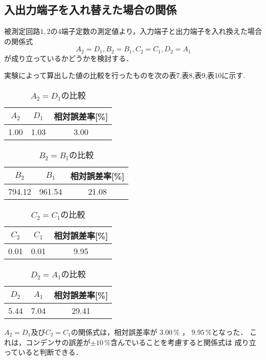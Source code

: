 \newpage

\subsection{入出力端子を入れ替えた場合の関係}
被測定回路$1,2$の4端子定数の測定値より，入力端子と出力端子を入れ換えた場合の関係式
$$
A_2=D_1, B_2=B_1, C_2=C_1, D_2=A_1
$$
が成り立っているかどうかを検討する．

実験によって算出した値の比較を行ったものを次の表7,表8,表9,表10に示す.

\begin{table}[!ht]
    \centering
    \caption{$A_2=D_1$の比較}
    \begin{tabular}{cc|c}
    \hline
        $A_2$ & $D_1$ & 相対誤差率[\%] \\ \hline
        1.00 & 1.03 & 3.00 \\ \hline
    \end{tabular}
\end{table}

\begin{table}[!ht]
    \centering
    \caption{$B_2=B_1$の比較}
    \begin{tabular}{cc|c}
    \hline
        $B_2$ & $B_1$ & 相対誤差率[\%] \\ \hline
        794.12 & 961.54 & 21.08 \\ \hline
    \end{tabular}
\end{table}

\begin{table}[!ht]
    \centering
    \caption{$C_2=C_1$の比較}
    \begin{tabular}{cc|c}
    \hline
        $C_2$ & $C_1$ & 相対誤差率[\%] \\ \hline
        0.01 & 0.01 & 9.95 \\ \hline
    \end{tabular}
\end{table}

\begin{table}[!ht]
    \centering
    \caption{$D_2=A_1$の比較}
    \begin{tabular}{cc|c}
    \hline
        $D_2$ & $A_1$ & 相対誤差率[\%] \\ \hline
        5.44 & 7.04 & 29.41 \\ \hline
    \end{tabular}
\end{table}

$A_2=D_1$及び$C_2=C_1$の関係式は，相対誤差率が
$3.00\,\%$ ， $9.95\,\%$となった．
これは，コンデンサの誤差が$\pm10\,\%$含んでいることを考慮すると関係式は
成り立っていると判断できる．

